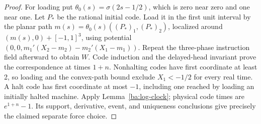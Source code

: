 \begin{proof}
For loading put $\theta_0(s)=\sigma(2s-1/2)$, which is zero near zero
and one near one. Let $P_*$ be the rational initial code. Load it in the
first unit interval by the planar path
$m(s)=\theta_0(s)((P_*)_1,(P_*)_2)$, localized around
$(m(s),0)+[-1,1]^3$, using potential
$(0,0,m_1'(X_2-m_2)-m_2'(X_1-m_1))$.
Repeat the three-phase instruction field afterward to obtain $W$.
Code induction and the delayed-head invariant prove the correspondence
at times $1+n$.  Nonhalting codes have first coordinate at least 2,
so loading and the convex-path bound exclude $X_1<-1/2$ for every real
time.  A halt code has first coordinate at most $-1$, including one
reached by loading an initially halted machine.  Apply
Lemma~\ref{ba:log-clock}; physical code times are $e^{1+n}-1$.
Its support, derivative, event, and uniqueness conclusions give precisely
the claimed separate force choice.
\end{proof}
